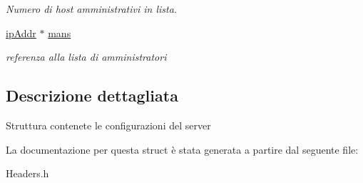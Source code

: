 \begin{DoxyCompactItemize}
\begin{DoxyCompactList}\small\item\em Numero di host amministrativi in lista. \end{DoxyCompactList}\item 
\hyperlink{unionipAddr}{ip\+Addr} $\ast$ \hyperlink{structconf_a4e1650a523f01ccb65fda55aa2f2646d}{mans}\hypertarget{structconf_a4e1650a523f01ccb65fda55aa2f2646d}{}\label{structconf_a4e1650a523f01ccb65fda55aa2f2646d}

\begin{DoxyCompactList}\small\item\em referenza alla lista di amministratori \end{DoxyCompactList}\end{DoxyCompactItemize}


\subsection{Descrizione dettagliata}
Struttura contenete le configurazioni del server 

La documentazione per questa struct è stata generata a partire dal seguente file\+:\begin{DoxyCompactItemize}
\item 
Headers.\+h\end{DoxyCompactItemize}
